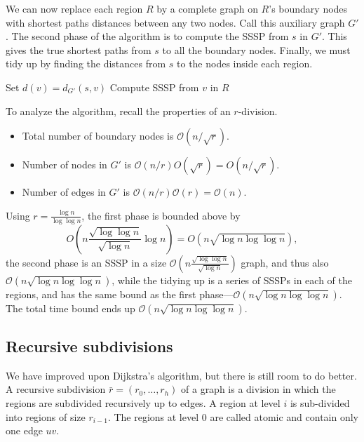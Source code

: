 \documentclass[11pt]{article}
\begin{document}
 We can now replace each region $R$ by a complete graph on $R$'s boundary nodes with shortest paths distances between any two nodes. Call this auxiliary graph $G'$. The second phase of the algorithm is to compute the SSSP from $s$ in $G'$. This gives the true shortest paths from $s$ to all the boundary nodes. Finally, we must tidy up by finding the distances from $s$ to the nodes inside each region.

\begin{algorithm}[!htb]
  \label{alg:sssp-full}
  \begin{algorithmic}
        \State Set $d(v) = d_{G'}(s,v)$
        \State Compute SSSP from $v$ in $R$
      \EndFor
    \EndFor
  \end{algorithmic}
\end{algorithm}

To analyze the algorithm, recall the properties of an $r$-division.
\begin{itemize}
\item Total number of boundary nodes is $\mathcal{O}(n/\sqrt{r})$.
\item Number of nodes in $G'$ is $\mathcal{O}(n/r)O(\sqrt{r})=O(n/\sqrt{r})$.
\item Number of edges in $G'$ is $\mathcal{O}(n/r)\mathcal{O}(r) = \mathcal{O}(n)$.
\end{itemize}

Using $r=\frac{\log n}{\log \log n}$, the first phase is bounded above by
\[
  O\left(n\frac{\sqrt{\log \log n}}{\sqrt{\log n}} \log n\right)= O(n \sqrt{\log n \log \log n}),
\]
the second phase is an SSSP in a size $\mathcal{O}(n \frac{\sqrt{\log \log n}}{\sqrt{\log n}})$ graph, and thus also $\mathcal{O}(n \sqrt{\log n \log \log n})$, while the tidying up is a series of SSSPs in each of the regions, and has the same bound as the first phase---$\mathcal{O}(n \sqrt{\log n \log \log n})$. The total time bound ends up $\mathcal{O}(n \sqrt{\log n \log \log n})$.

\subsection{Recursive subdivisions}
\label{sec:recursion}

We have improved upon Dijkstra's algorithm, but there is still room to do better. A recursive subdivision $\bar{r} = (r_0, \ldots, r_h)$ of a graph is a division in which the regions are subdivided recursively up to edges. A region at level $i$ is sub-divided into regions of size $r_{i-1}$. The regions at level $0$ are called atomic and contain only one edge $uv$.
\end{document}
